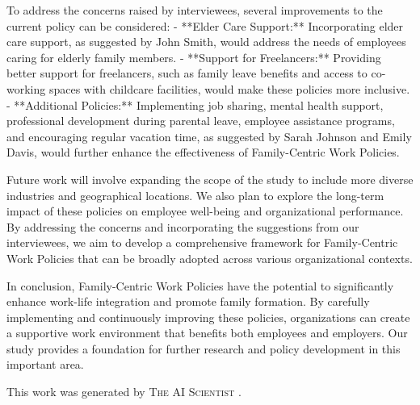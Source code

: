 \documentclass{article} %
\begin{document}
To address the concerns raised by interviewees, several improvements to the current policy can be considered:
- **Elder Care Support:** Incorporating elder care support, as suggested by John Smith, would address the needs of employees caring for elderly family members.
- **Support for Freelancers:** Providing better support for freelancers, such as family leave benefits and access to co-working spaces with childcare facilities, would make these policies more inclusive.
- **Additional Policies:** Implementing job sharing, mental health support, professional development during parental leave, employee assistance programs, and encouraging regular vacation time, as suggested by Sarah Johnson and Emily Davis, would further enhance the effectiveness of Family-Centric Work Policies.

Future work will involve expanding the scope of the study to include more diverse industries and geographical locations. We also plan to explore the long-term impact of these policies on employee well-being and organizational performance. By addressing the concerns and incorporating the suggestions from our interviewees, we aim to develop a comprehensive framework for Family-Centric Work Policies that can be broadly adopted across various organizational contexts.

In conclusion, Family-Centric Work Policies have the potential to significantly enhance work-life integration and promote family formation. By carefully implementing and continuously improving these policies, organizations can create a supportive work environment that benefits both employees and employers. Our study provides a foundation for further research and policy development in this important area.

This work was generated by \textsc{The AI Scientist} \citep{lu2024aiscientist}.



\end{document}

